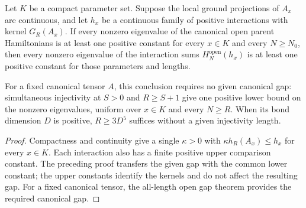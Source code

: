 \begin{lemma}
    \label{thm:compact_open_positive_parent_gap}
    \leanok
    Let $K$ be a compact parameter set. Suppose the local ground projections
    of $A_x$ are continuous, and let $h_x$ be a continuous family of positive
    interactions with kernel $G_R(A_x)$. If every nonzero eigenvalue of the
    canonical open parent Hamiltonians is at least one positive constant for
    every $x\in K$ and every $N\geq N_0$, then every nonzero eigenvalue of
    the interaction sums $H^{\mathrm{open}}_N(h_x)$ is at least one positive
    constant for those parameters and lengths.

    For a fixed canonical tensor $A$, this conclusion requires no given
    canonical gap: simultaneous injectivity at $S>0$ and $R\geq S+1$
    give one positive lower bound on the nonzero eigenvalues, uniform over
    $x\in K$ and every $N\geq R$.
    When its bond dimension $D$ is positive, $R\geq3D^5$ suffices without
    a given injectivity length.
\end{lemma}
\begin{proof}\leanok
    Compactness and continuity give a single $\kappa>0$ with
    $\kappa h_R(A_x)\leq h_x$ for every $x\in K$. Each interaction also
    has a finite positive upper comparison constant. The preceding proof
    transfers the given gap with the common lower constant; the upper
    constants identify the kernels and do not affect the resulting gap.
    For a fixed canonical tensor, the all-length open gap theorem provides the
    required canonical gap.
\end{proof}

